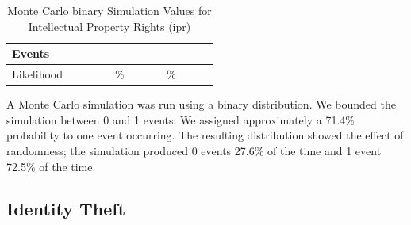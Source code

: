 \begin{table}[H]
  \centering
  \caption{Monte Carlo \gls{binary} Simulation Values for Intellectual Property Rights (\gls{ipr})}
  \label{tab:binary_ipr_montecarlo}
  \begin{center}
  \begin{tabular}{@{}>{\centering\arraybackslash}
  p{0.30\linewidth} >{\centering\arraybackslash}
  p{0.15\linewidth} >{\centering\arraybackslash}
  p{0.15\linewidth}}
    \toprule
Events  & 0 & 1\\
    \midrule
Likelihood  & 27.6\% & 72.5\%\\
    \bottomrule
  \end{tabular}
  \end{center}
  \raggedright{A Monte Carlo simulation was run using a \gls{binary}
  distribution.  We bounded the simulation between 0 and 1 events.  We assigned approximately a
  71.4\% probability to one event occurring.  The resulting distribution showed the effect of
  randomness; the simulation produced 0 events 27.6\% of the time and 1 event 72.5\% of the time.}
\end{table}


\newpage
\subsection{Identity Theft}\label{sec:identitytheft}
